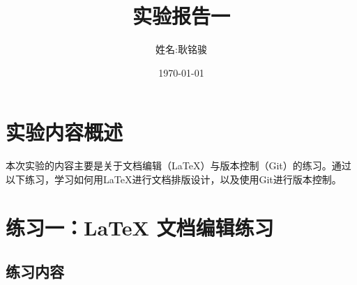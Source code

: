 \documentclass[12pt]{article}
\title{实验报告一}
\author{姓名:耿铭骏}
\date{\today}
\begin{document}
\maketitle

\section*{实验内容概述}
本次实验的内容主要是关于文档编辑（LaTeX）与版本控制（Git）的练习。通过以下练习，学习如何用LaTeX进行文档排版设计，以及使用Git进行版本控制。

\section*{练习一：LaTeX 文档编辑练习}

\subsection*{练习内容}
\end{document}
